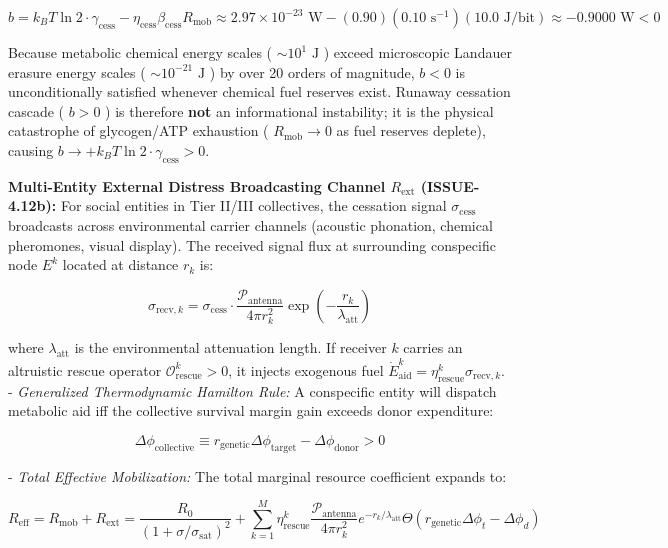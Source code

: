 \documentclass[11pt,a4paper]{article}
\theoremstyle{definition}
\theoremstyle{remark}
\begin{document}
\begin{equation}
b = k_B T \ln 2 \cdot \gamma_{\text{cess}} - \eta_{\text{cess}}\beta_{\text{cess}} R_{\text{mob}} \approx 2.97 \times 10^{-23}\text{ W} - (0.90)(0.10\text{ s}^{-1})(10.0\text{ J/bit}) \approx -0.9000\text{ W} < 0
\end{equation}


Because metabolic chemical energy scales ( $\sim 10^1\text{ J}$ ) exceed microscopic Landauer erasure energy scales ( $\sim 10^{-21}\text{ J}$ ) by over 20 orders of magnitude, $b < 0$ is unconditionally satisfied whenever chemical fuel reserves exist. Runaway cessation cascade ( $b > 0$ ) is therefore \textbf{not} an informational instability; it is the physical catastrophe of glycogen/ATP exhaustion ( $R_{\text{mob}} \to 0$ as fuel reserves deplete), causing $b \to +k_B T \ln 2 \cdot \gamma_{\text{cess}} > 0$.

\textbf{Multi-Entity External Distress Broadcasting Channel $R_{\text{ext}}$ (ISSUE-4.12b):} For social entities in Tier II/III collectives, the cessation signal $\sigma_{\text{cess}}$ broadcasts across environmental carrier channels (acoustic phonation, chemical pheromones, visual display). The received signal flux at surrounding conspecific node $E^k$ located at distance $r_k$ is:


\begin{equation}
\sigma_{\text{recv},k} = \sigma_{\text{cess}} \cdot \frac{\mathcal{P}_{\text{antenna}}}{4\pi r_k^2} \exp\left(-\frac{r_k}{\lambda_{\text{att}}}\right)
\end{equation}


where $\lambda_{\text{att}}$ is the environmental attenuation length. If receiver $k$ carries an altruistic rescue operator $\mathcal{O}_{\text{rescue}}^k > 0$, it injects exogenous fuel $\dot{E}_{\text{aid}}^k = \eta_{\text{rescue}}^k \sigma_{\text{recv},k}$.
- \textit{Generalized Thermodynamic Hamilton Rule:} A conspecific entity will dispatch metabolic aid iff the collective survival margin gain exceeds donor expenditure:


\begin{equation}
\Delta \phi_{\text{collective}} \equiv r_{\text{genetic}} \Delta \phi_{\text{target}} - \Delta \phi_{\text{donor}} > 0
\end{equation}


- \textit{Total Effective Mobilization:} The total marginal resource coefficient expands to:


\begin{equation}
\boxed{R_{\text{eff}} = R_{\text{mob}} + R_{\text{ext}} = \frac{R_0}{(1 + \sigma/\sigma_{\text{sat}})^2} + \sum_{k=1}^M \eta_{\text{rescue}}^k \frac{\mathcal{P}_{\text{antenna}}}{4\pi r_k^2} e^{-r_k/\lambda_{\text{att}}} \Theta\left(r_{\text{genetic}}\Delta\phi_t - \Delta\phi_d\right)}
\end{equation}
\end{document}
